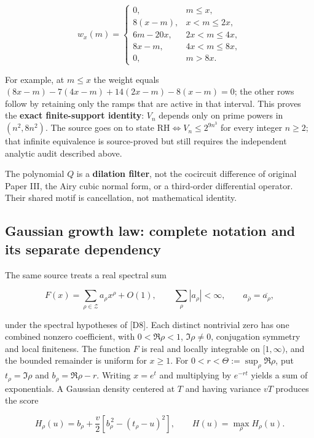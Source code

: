 \documentclass[
  10pt,
  a4paper,
  10pt,
  oneside,
  openany]{book}
\begin{document}
\[
w_x(m)=\begin{cases}
  0,&m\le x,\\
  8(x-m),&x<m\le2x,\\
  6m-20x,&2x<m\le4x,\\
  8x-m,&4x<m\le8x,\\
  0,&m>8x.
\end{cases}
\tag{S11.17}\label{eq:S11.17}
\]

For example, at \(m\le x\) the weight equals
\((8x-m)-7(4x-m)+14(2x-m)-8(x-m)=0\); the other rows follow by retaining
only the ramps that are active in that interval. This proves the
\textbf{exact finite-support identity}: \(V_n\) depends only on prime
powers in \((n^2,8n^2)\). The source goes on to state
\(\mathrm{RH}\Longleftrightarrow V_n\le 2^{9n^3}\) for every integer
\(n\ge2\); that infinite equivalence is source-proved but still requires
the independent analytic audit described above.

The polynomial \(Q\) is a \textbf{dilation filter}, not the cocircuit
difference of original Paper III, the Airy cubic normal form, or a
third-order differential operator. Their shared motif is cancellation,
not mathematical identity.

\subsection{Gaussian growth law: complete notation and its separate
dependency}\label{gaussian-growth-law-complete-notation-and-its-separate-dependency}

The same source treats a real spectral sum

\[
F(x)=\sum_{\rho\in\mathcal Z}a_\rho x^\rho+O(1),
\qquad \sum_\rho|a_\rho|<\infty,
\qquad a_{\bar\rho}=\overline{a_\rho},
\tag{S11.18}\label{eq:S11.18}
\]

under the spectral hypotheses of {[}D8{]}. Each distinct nontrivial zero
has one combined nonzero coefficient, with \(0<\Re\rho<1\),
\(\Im\rho\ne0\), conjugation symmetry and local finiteness. The function
\(F\) is real and locally integrable on \([1,\infty)\), and the bounded
remainder is uniform for \(x\ge1\). For
\(0<r<\Theta:=\sup_\rho\Re\rho\), put \(t_\rho=\Im\rho\) and
\(b_\rho=\Re\rho-r\). Writing \(x=e^t\) and multiplying by \(e^{-rt}\)
yields a sum of exponentials. A Gaussian density centered at \(T\) and
having variance \(vT\) produces the score

\[
H_\rho(u)=b_\rho+
 \frac v2\left[b_\rho^{\,2}-(t_\rho-u)^2\right],
\qquad
H(u)=\max_\rho H_\rho(u).
\tag{S11.19}\label{eq:S11.19}
\]
\end{document}
